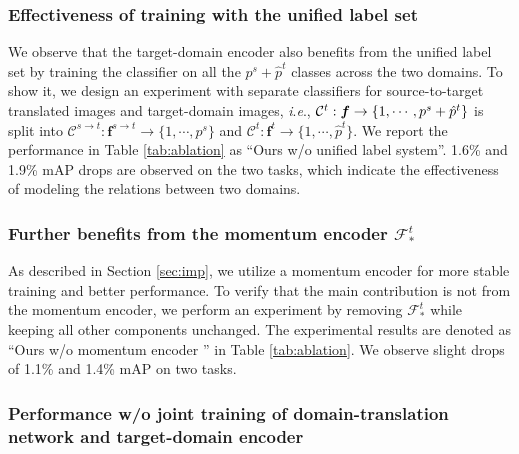 \documentclass[journal]{IEEEtran}
\def\vf{{\bm{f}}}
\newcommand{\ie}{\textit{i}.\textit{e}., }
\begin{document}
\subsubsection{\textbf{Effectiveness of training with the unified label set}}
We observe that the target-domain encoder also benefits from the unified label set by training the classifier on all the $p^s+\hat{p}^t$ classes across the two domains.
To show it, we design an experiment with separate classifiers for source-to-target translated images and target-domain images,
\ie ${{\cal C}^t}:\vf\rightarrow\{1,\cdots, p^s+\hat{p}^t \}$ is split into $\mathcal{C}^{s\to t}:\vf^{s\to t} \rightarrow\{1,\cdots, p^s\}$ and $\mathcal{C}^t:\vf^t \rightarrow\{1,\cdots, \hat{p}^t \}$.
We report the performance in Table \ref{tab:ablation} as ``Ours w/o unified label system''.
1.6\% and 1.9\% mAP drops are observed on the two tasks, which indicate the effectiveness of modeling the relations between two domains.


\subsubsection{\textbf{Further benefits from the momentum encoder $\mathcal{F}^t_*$}}
As described in Section \ref{sec:imp}, we utilize a momentum encoder \cite{he2019momentum} for more stable training and better performance.
To verify that the main contribution is not from the momentum encoder,
we perform an experiment by removing  $\mathcal{F}^t_*$ while keeping all other components unchanged.
The experimental results are denoted as ``Ours w/o momentum encoder \cite{he2019momentum}'' in Table \ref{tab:ablation}.
We observe slight drops of 1.1\% and 1.4\% mAP on two tasks.


\subsubsection{\textbf{Performance w/o joint training of domain-translation network and target-domain encoder}}
\label{sec:woj}
\end{document}
